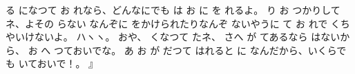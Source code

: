 る
になつて
お
れなら、どんなにでも
は
お
に
を
れるよ。
り
お
つかりしてネ、よその
らない
なんぞに
をかけられたりなんぞ
ないやうに
て
お
れで
くちやいけないよ。
ハヽヽ。
おや、
くなつて
たネ、
さへ
が
てあるなら
はないから、
お
へ
つておいでな。
あ
お
が
だつて
はれると
に
なんだから、いくらでも
いておいで！。
』

